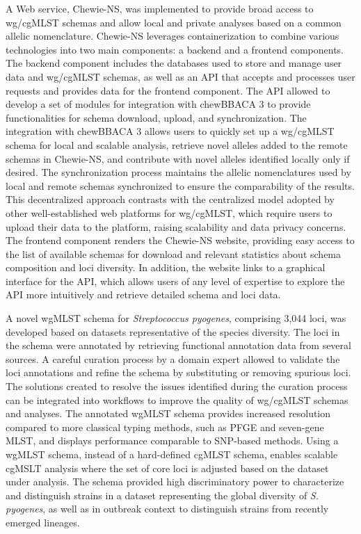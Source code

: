 A Web service, Chewie-NS, was implemented to provide broad access to wg/cgMLST schemas and allow local and private analyses based on a common allelic nomenclature. Chewie-NS leverages containerization to combine various technologies into two main components: a backend and a frontend components. The backend component includes the databases used to store and manage user data and wg/cgMLST schemas, as well as an API that accepts and processes user requests and provides data for the frontend component. The API allowed to develop a set of modules for integration with chewBBACA 3 to provide functionalities for schema download, upload, and synchronization. The integration with chewBBACA 3 allows users to quickly set up a wg/cgMLST schema for local and scalable analysis, retrieve novel alleles added to the remote schemas in Chewie-NS, and contribute with novel alleles identified locally only if desired. The synchronization process maintains the allelic nomenclatures used by local and remote schemas synchronized to ensure the comparability of the results. This decentralized approach contrasts with the centralized model adopted by other well-established web platforms for wg/cgMLST, which require users to upload their data to the platform, raising scalability and data privacy concerns. The frontend component renders the Chewie-NS website, providing easy access to the list of available schemas for download and relevant statistics about schema composition and loci diversity. In addition, the website links to a graphical interface for the API, which allows users of any level of expertise to explore the API more intuitively and retrieve detailed schema and loci data.

A novel wgMLST schema for \textit{Streptococcus pyogenes}, comprising 3,044 loci, was developed based on datasets representative of the species diversity. The loci in the schema were annotated by retrieving functional annotation data from several sources. A careful curation process by a domain expert allowed to validate the loci annotations and refine the schema by substituting or removing spurious loci. The solutions created to resolve the issues identified during the curation process can be integrated into workflows to improve the quality of wg/cgMLST schemas and analyses. The annotated wgMLST schema provides increased resolution compared to more classical typing methods, such as PFGE and seven-gene MLST, and displays performance comparable to SNP-based methods. Using a wgMLST schema, instead of a hard-defined cgMLST schema, enables scalable cgMSLT analysis where the set of core loci is adjusted based on the dataset under analysis. The schema provided high discriminatory power to characterize and distinguish strains in a dataset representing the global diversity of \textit{S. pyogenes}, as well as in outbreak context to distinguish strains from recently emerged lineages.

